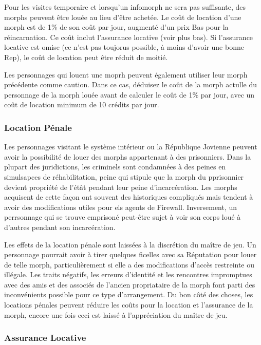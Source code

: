 Pour les visites temporaire et lorsqu'un infomorph ne sera pas suffisante, des morphs peuvent être louée au lieu d'être achetée. Le coût de location d'une morph est de 1\% de son coût par jour, augmenté d'un prix Bas pour la réincarnation. Ce coût inclut l'assurance locative (voir plus bas). Si l'assurance locative est omise (ce n'est pas toujorus possible, à moins d'avoir une bonne Rep), le coût de location peut être réduit de moitié. 

Les personnages qui louent une moprh peuvent également utiliser leur morph précédente comme caution. Dans ce cas, déduisez le coût de la morph actulle du personnage de la morph louée avant de calculer le coût de 1\% par jour, avec un coût de location minimum de 10 crédits par jour. 

\subsubsection{Location Pénale} 

Les personnages visitant le système intérieur ou la République Jovienne peuvent avoir la possibilité de louer des morphs appartenant à des prisonniers. Dans la plupart des juridictions, les criminels sont condamnées à des peines en simulsapces de réhabilitation, peine qui stipule que la morph du pprisonnier devient propriété de l'étât pendant leur peine d'incarcération. Les morphs acquisent de cette façon ont souvent des historiques compliqués mais tendent à avoir des modifications utiles pour els agents de Firewall. Inversement, un perrsonnage qui se trouve emprisoné peut-être sujet à voir son corps loué à d'autres pendant son incarcération. 

Les effets de la location pénale sont laissées à la discrétion du maître de jeu. Un personnage pourrait avoir à tirer quelques ficelles avec sa Réputation pour louer de telle morph, particulièrement si elle a des modifications d'accès restreinte ou illégale. Les traits négatifs, les erreurs d'identité et les rencontres impromptues avec des amis et des associés de l'ancien propriataire de la morph font parti des inconvénients possible pour ce type d'arrangement. Du bon côté des choses, les locations pénales peuvent réduire les coûts pour la location et l'assurance de la morph, encore une fois ceci est laissé à l'appréciation du maître de jeu. 

\subsubsection{Assurance Locative} 

